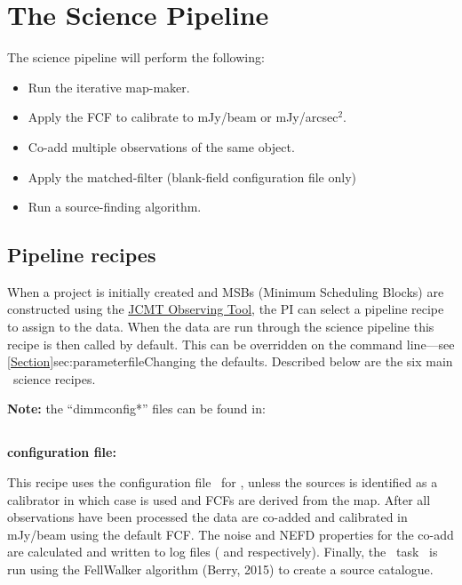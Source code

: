 \section{The Science Pipeline}

The science pipeline will perform the following:
\vspace{-0.3cm}
\begin{itemize}\itemsep-0.3em
\item Run the iterative map-maker.
\item Apply the FCF to calibrate to mJy/beam or mJy/arcsec$^2$.
\item Co-add multiple observations of the same object.
\item Apply the matched-filter (blank-field configuration file only)
\item Run a source-finding algorithm.
\end{itemize}

\subsection{Pipeline recipes}
\label{sec:recipes}

When a project is initially created and MSBs (Minimum Scheduling Blocks)
are constructed using the \href{https://www.eaobservatory.org/jcmt/observing/omp/observing-tool/}{JCMT Observing Tool}, 
the PI can select a pipeline recipe to assign
to the data. When the data are run through the science pipeline this
recipe is then called by default. This can be overridden on the command
line---see \cref{Section}{sec:parameterfile}{Changing the defaults}.
Described below are the six main \oracdr\ science recipes. 

\textbf{Note:} the ``dimmconfig*'' files can be found in: 

\begin{terminalv}
\end{terminalv}

\subsection{}

\textbf{configuration file: }

This recipe uses the configuration file \jsageneric\ for \makemap, unless
the sources is identified as a calibrator in which case  is used and
FCFs are derived from the map. After all observations have
been processed the data are co-added and calibrated in mJy/beam using
the default FCF. The noise and NEFD properties for the co-add are
calculated and written to log files ( and
 respectively). Finally, the \cupid\ task \findclumps\
is run using the FellWalker algorithm (Berry, 2015\cite{fellwalker}) to
create a source catalogue.

